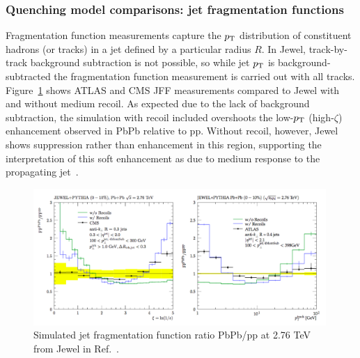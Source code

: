 \subsubsection{Quenching model comparisons: jet fragmentation functions}
\label{sec:theory_jff}

Fragmentation function measurements capture the $p_{\rm T}$ distribution of constituent hadrons (or tracks) in a jet defined by a particular radius $R$.  In {\sc Jewel}, track-by-track background subtraction is not possible, so while jet $p_{\rm T}$ is background-subtracted the fragmentation function measurement is carried out with all tracks.  Figure~\ref{fig:jewel_jff} shows ATLAS and CMS JFF measurements compared to {\sc Jewel} with and without medium recoil.  As expected due to the lack of background subtraction, the simulation with recoil included overshoots the low-$p_{\rm T}$ (high-$\zeta$) enhancement observed in PbPb relative to pp.  Without recoil, however, {\sc Jewel} shows suppression rather than enhancement in this region, supporting the interpretation of this soft enhancement as due to medium response to the propagating jet~\cite{Elayavalli:2017hxo}.  

 \begin{figure}[hbtp]
\begin{center}
\includegraphics[width=0.99\textwidth]{figures/Models/JEWEL_JFF.png}
\caption[Simulated JFF ratio PbPb/pp at 2.76 TeV from {\sc Jewel}]{Simulated jet fragmentation function ratio PbPb/pp  at 2.76 TeV from {\sc Jewel} in Ref.~\cite{Elayavalli:2017hxo}.}
\label{fig:jewel_jff}
\end{center}
\end{figure}

